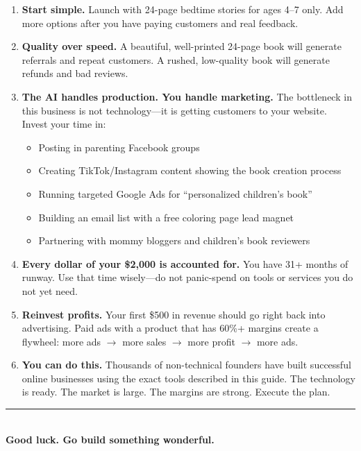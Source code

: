 \documentclass[12pt, letterpaper, oneside]{book}
\begin{document}
\begin{enumerate}[leftmargin=2em, itemsep=8pt]
  \item \textbf{Start simple.} Launch with 24-page bedtime stories for ages 4--7 only. Add more options after you have paying customers and real feedback.

  \item \textbf{Quality over speed.} A beautiful, well-printed 24-page book will generate referrals and repeat customers. A rushed, low-quality book will generate refunds and bad reviews.

  \item \textbf{The AI handles production. You handle marketing.} The bottleneck in this business is not technology---it is getting customers to your website. Invest your time in:
  \begin{itemize}[leftmargin=1.5em]
    \item Posting in parenting Facebook groups
    \item Creating TikTok/Instagram content showing the book creation process
    \item Running targeted Google Ads for ``personalized children's book''
    \item Building an email list with a free coloring page lead magnet
    \item Partnering with mommy bloggers and children's book reviewers
  \end{itemize}

  \item \textbf{Every dollar of your \$2{,}000 is accounted for.} You have 31+ months of runway. Use that time wisely---do not panic-spend on tools or services you do not yet need.

  \item \textbf{Reinvest profits.} Your first \$500 in revenue should go right back into advertising. Paid ads with a product that has 60\%+ margins create a flywheel: more ads $\rightarrow$ more sales $\rightarrow$ more profit $\rightarrow$ more ads.

  \item \textbf{You can do this.} Thousands of non-technical founders have built successful online businesses using the exact tools described in this guide. The technology is ready. The market is large. The margins are strong. Execute the plan.
\end{enumerate}

\vfill
\begin{center}
\rule{2in}{0.4pt}\\[12pt]
{\large\textcolor{primary}{\textbf{Good luck. Go build something wonderful.}}}
\end{center}
\end{document}

